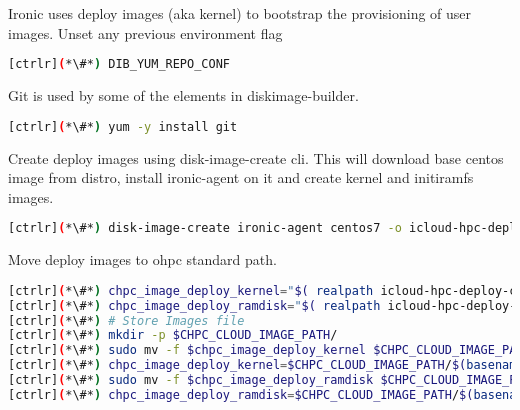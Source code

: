 Ironic uses deploy images (aka kernel) to bootstrap the provisioning of user images. 
Unset any previous environment flag


\begin{lstlisting}[language=bash,keywords={}]
[ctrlr](*\#*) DIB_YUM_REPO_CONF
\end{lstlisting} 


Git is used by some of the elements in diskimage-builder. 

\begin{lstlisting}[language=bash,keywords={}]
[ctrlr](*\#*) yum -y install git
\end{lstlisting} 


Create deploy images using disk-image-create cli. This will download base centos image from distro, install ironic-agent on it and create kernel and initiramfs images.

\begin{lstlisting}[language=bash,keywords={}]
[ctrlr](*\#*) disk-image-create ironic-agent centos7 -o icloud-hpc-deploy-c7
\end{lstlisting} 

Move deploy images to ohpc standard path.

\begin{lstlisting}[language=bash,keywords={}]
[ctrlr](*\#*) chpc_image_deploy_kernel="$( realpath icloud-hpc-deploy-c7.kernel)"
[ctrlr](*\#*) chpc_image_deploy_ramdisk="$( realpath icloud-hpc-deploy-c7.initramfs)"
[ctrlr](*\#*) # Store Images file
[ctrlr](*\#*) mkdir -p $CHPC_CLOUD_IMAGE_PATH/
[ctrlr](*\#*) sudo mv -f $chpc_image_deploy_kernel $CHPC_CLOUD_IMAGE_PATH/
[ctrlr](*\#*) chpc_image_deploy_kernel=$CHPC_CLOUD_IMAGE_PATH/$(basename $chpc_image_deploy_kernel)
[ctrlr](*\#*) sudo mv -f $chpc_image_deploy_ramdisk $CHPC_CLOUD_IMAGE_PATH/
[ctrlr](*\#*) chpc_image_deploy_ramdisk=$CHPC_CLOUD_IMAGE_PATH/$(basename $chpc_image_deploy_ramdisk)
\end{lstlisting} 
